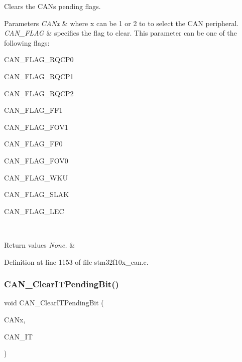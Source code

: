 Clears the C\+AN\textquotesingle{}s pending flags. 


\begin{DoxyParams}{Parameters}
{\em C\+A\+Nx} & where x can be 1 or 2 to to select the C\+AN peripheral. \\
\hline
{\em C\+A\+N\+\_\+\+F\+L\+AG} & specifies the flag to clear. This parameter can be one of the following flags\+:
\begin{DoxyItemize}
\item C\+A\+N\+\_\+\+F\+L\+A\+G\+\_\+\+R\+Q\+C\+P0
\item C\+A\+N\+\_\+\+F\+L\+A\+G\+\_\+\+R\+Q\+C\+P1
\item C\+A\+N\+\_\+\+F\+L\+A\+G\+\_\+\+R\+Q\+C\+P2
\item C\+A\+N\+\_\+\+F\+L\+A\+G\+\_\+\+F\+F1
\item C\+A\+N\+\_\+\+F\+L\+A\+G\+\_\+\+F\+O\+V1
\item C\+A\+N\+\_\+\+F\+L\+A\+G\+\_\+\+F\+F0
\item C\+A\+N\+\_\+\+F\+L\+A\+G\+\_\+\+F\+O\+V0
\item C\+A\+N\+\_\+\+F\+L\+A\+G\+\_\+\+W\+KU
\item C\+A\+N\+\_\+\+F\+L\+A\+G\+\_\+\+S\+L\+AK
\item C\+A\+N\+\_\+\+F\+L\+A\+G\+\_\+\+L\+EC 
\end{DoxyItemize}\\
\hline
\end{DoxyParams}

\begin{DoxyRetVals}{Return values}
{\em None.} & \\
\hline
\end{DoxyRetVals}


Definition at line 1153 of file stm32f10x\+\_\+can.\+c.

\mbox{\label{group___c_a_n___exported___functions_ga30bf7ac0c1793f6622a4a1adbb7dbc8a}} 
\subsubsection{\texorpdfstring{C\+A\+N\+\_\+\+Clear\+I\+T\+Pending\+Bit()}{CAN\_ClearITPendingBit()}}
{\footnotesize\ttfamily void C\+A\+N\+\_\+\+Clear\+I\+T\+Pending\+Bit (\begin{DoxyParamCaption}\item[{\hyperlink{struct_c_a_n___type_def}{C\+A\+N\+\_\+\+Type\+Def} $\ast$}]{C\+A\+Nx,  }\item[{uint32\+\_\+t}]{C\+A\+N\+\_\+\+IT }\end{DoxyParamCaption})}



